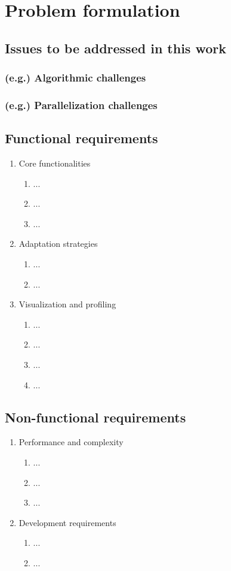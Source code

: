 
\chapter{Problem formulation} \label{chap:problem-formulation}


\section{Issues to be addressed in this work}

\subsection{(e.g.) Algorithmic challenges}

\subsection{(e.g.) Parallelization challenges}

\section{Functional requirements}

\begin{enumerate}
	\item Core functionalities
	\begin{enumerate}
		\item ...
		\item ...
		\item ...
	\end{enumerate}

	\item Adaptation strategies
	\begin{enumerate}
		\item ...
		\item ...
	\end{enumerate}

	\item Visualization and profiling
	\begin{enumerate}
		\item ...
		\item ...
		\item ...
		\item ...
	\end{enumerate}
\end{enumerate}


\section{Non-functional requirements}

\begin{enumerate}
	\item Performance and complexity
	\begin{enumerate}
		\item ...
		\item ...
		\item ...
	\end{enumerate}

	\item Development requirements
	\begin{enumerate}
		\item ...
		\item ...
	\end{enumerate}
\end{enumerate}
